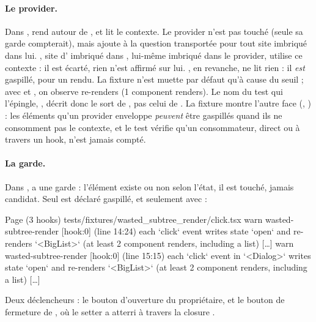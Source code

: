\paragraph{Le provider.} Dans ,  rend
 autour de , et
 lit le contexte. Le provider n'est pas touché (seule sa garde compterait), mais
 ajoute  à la question transportée pour tout site imbriqué
dans lui. , site d' imbriqué dans , lui-même imbriqué dans
le provider, utilise ce contexte : il est écarté, rien n'est affirmé sur lui. , en
revanche, ne lit rien : il \emph{est} gaspillé, pour un rendu. La fixture n'est muette par défaut
qu'à cause du seuil ; avec  et , on observe
\og re-renders  (1 component renders)\fg{}. Le nom du test qui l'épingle,
, décrit donc le sort de
, pas celui de . La fixture
 montre l'autre face (, ) : les éléments qu'un provider
enveloppe \emph{peuvent} être gaspillés quand ils ne consomment pas le contexte, et le test
 vérifie qu'un consommateur, direct ou à travers un
hook, n'est jamais compté.

\paragraph{La garde.} Dans ,  a une
garde  : l'élément existe ou non selon l'état, il est touché, jamais candidat.
Seul  est déclaré gaspillé, et seulement avec  :
\begin{sortie}
  Page  (3 hooks)  tests/fixtures/wasted_subtree_render/click.tsx
    warn   wasted-subtree-render  [hook:0]  (line 14:24)  each `click` event writes state `open` and
      re-renders `<BigList>` (at least 2 component renders, including a list) […]
    warn   wasted-subtree-render  [hook:0]  (line 15:15)  each `click` event in `<Dialog>` writes
      state `open` and re-renders `<BigList>` (at least 2 component renders, including a list) […]
\end{sortie}
Deux déclencheurs : le bouton d'ouverture du propriétaire, et le bouton de fermeture de
, où le setter a atterri à travers la closure .

